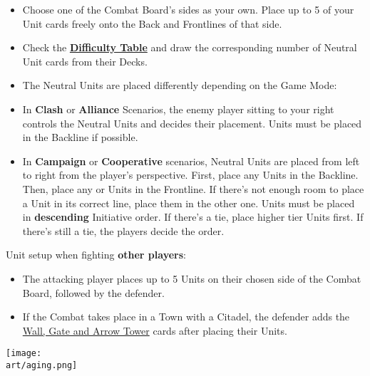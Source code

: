 \begin{multicols}{2}
\begin{itemize}
  \item Choose one of the Combat Board's sides as your own.
    Place up to 5 of your Unit cards freely onto the Back and Frontlines of that side.
  \item Check the \hyperlink{Difficulty}{\textbf{Difficulty Table}} and draw the corresponding number of Neutral Unit cards from their Decks.
  \item The Neutral Units are placed differently depending on the Game Mode:
  \item In \textbf{Clash} or \textbf{Alliance} Scenarios, the enemy player sitting to your right controls the Neutral Units and decides their placement.
     Units must be placed in the Backline if possible.
  \item In \textbf{Campaign} or \textbf{Cooperative} scenarios, Neutral Units are placed from left to right from the player's perspective.
First, place any  Units in the Backline.
Then, place any  or  Units in the Frontline.
If there's not enough room to place a Unit in its correct line, place them in the other one.
Units must be placed in \textbf{descending} Initiative order.
If there's a tie, place higher tier Units first.
If there's still a tie, the players decide the order.
\end{itemize}
Unit setup when fighting \textbf{other players}:
\begin{itemize}[wide]
  \item The attacking player places up to 5 Units on their chosen side of the Combat Board, followed by the defender.
  \item If the Combat takes place in a Town with a Citadel, the defender adds the \hyperlink{Walls}{Wall, Gate and Arrow Tower} cards after placing their Units.
\end{itemize}
\vfill
\begin{center}
  \texttt{[image: \\art/aging.png]}
\end{center}
\vfill
{}


\end{multicols}
